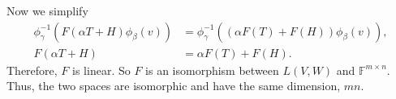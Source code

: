 \documentclass[12pt]{article}
\newcommand{\F}{\mathbb{F}}
\begin{document}
Now we simplify
\begin{align*}
    \phi_\gamma^{-1}(F(\alpha T + H)\phi_\beta(v)) &= \phi_\gamma^{-1}((\alpha F(T) + F(H))\phi_\beta(v)), \\
    F(\alpha T + H) &= \alpha F(T) + F(H).
\end{align*}
Therefore, $F$ is linear. So $F$ is an isomorphism between $L(V,W)$ and $\F^{m\times n}$. Thus, the two spaces are isomorphic and have the same dimension, $mn$.
\end{document}
